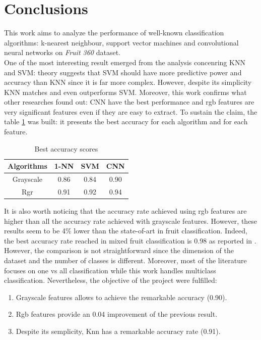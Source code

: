 \documentclass{article}
\begin{document}
\section{Conclusions}
This work aims to analyze the performance of well-known classification algorithms: k-nearest neighbour, support vector machines and convolutional neural networks on \textit{Fruit 360} dataset.\\
One of the most interesting result emerged from the analysis concenring KNN and SVM: theory suggests that SVM should have more predictive power and accuracy than KNN since it is far more complex. However, despite its simplicity KNN matches and even outperforms SVM. Moreover, this work confirms what other researches found out: CNN have the best performance and rgb features are very significant features even if they are easy to extract. To sustain the claim, the table \ref{results} was built: it presents the best accuracy for each algorithm and for each feature.
\begin{table}[H]
\centering
 \begin{tabular}{|c|c|c|c|} 
 \hline
  Algorithms & 1-NN & SVM & CNN\\
 \hline
 Grayscale&0.86&0.84&0.90 \\
 \hline
 Rgr&0.91& 0.92 & 0.94  \\
 \hline
\end{tabular}
\caption{Best accuracy scores} \label{results}
\end{table}
\noindent It is also worth noticing that the accuracy rate achieved using rgb features are higher than all the accuracy rate achieved with grayscale features. However, these results seem to be 4\% lower than the state-of-art in fruit classification. Indeed, the best accuracy rate reached in mixed fruit classification is 0.98 as reported in \cite{review}. However, the comparison is not straightforward since the dimension of the dataset and the number of classes is different. Moreover, most of the literature focuses on one vs all classification while this work handles multiclass classification. Nevertheless, the objective of the project were fulfilled:
\begin{enumerate}
\item Grayscale features allows to achieve the remarkable accuracy (0.90).
\item Rgb features provide an 0.04 improvement of the previous result.
\item Despite its semplicity, Knn has a remarkable accuracy rate (0.91).
\end{enumerate}
\end{document}

